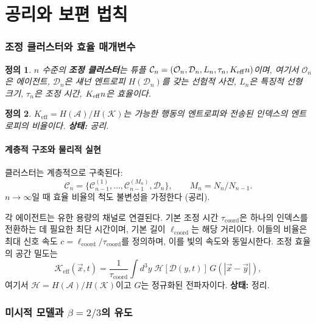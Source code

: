 \documentclass[11pt,a4paper]{article}
\newtheorem{definition}{정의}[section]
\newcommand{\Keff}[1][]{K_{\mathrm{eff}\if\relax\detokenize{#1}\relax\else,#1\fi}}
\newcommand{\coord}{\mathrm{coord}}
\newcommand{\Dir}{\mathcal{D}}
\newcommand{\cC}{\mathcal{C}}
\begin{document}
	\tableofcontents
	\newpage
	
	\part{공리와 보편 법칙}
	
	\section{조정 클러스터와 효율 매개변수}
	\begin{definition}
		\(n\) 수준의 \textbf{조정 클러스터}는 튜플 \(\cC_n = (\mathcal{O}_n, \Dir_n, L_n, \tau_n, \Keff{n})\)이며, 여기서 \(\mathcal{O}_n\)은 에이전트, \(\Dir_n\)은 섀넌 엔트로피 \(H(\Dir_n)\)를 갖는 선험적 사전, \(L_n\)은 특징적 선형 크기, \(\tau_n\)은 조정 시간, \(\Keff{n}\)은 효율이다.
	\end{definition}
	
	\begin{definition}
		\(K_{\mathrm{eff}} = H(\mathcal{A})/H(\mathcal{K})\)는 가능한 행동의 엔트로피와 전송된 인덱스의 엔트로피의 비율이다. \textbf{상태:} 공리.
	\end{definition}
	
	\subsection{계층적 구조와 물리적 실현}
	클러스터는 계층적으로 구축된다:
	\[
	\cC_n = \{\cC_{n-1}^{(1)},\dots,\cC_{n-1}^{(M_n)},\Dir_n\}, \qquad M_n = N_n/N_{n-1}.
	\]
	\(n\to\infty\)일 때 효율 비율의 척도 불변성을 가정한다 (공리).
	
	각 에이전트는 유한 용량의 채널로 연결된다. 기본 조정 시간 \(\tau_{\coord}\)은 하나의 인덱스를 전환하는 데 필요한 최단 시간이며, 기본 길이 \(\ell_{\coord}\)는 해당 거리이다. 이들의 비율은 최대 신호 속도 \(c = \ell_{\coord}/\tau_{\coord}\)를 정의하며, 이를 빛의 속도와 동일시한다. 조정 효율의 공간 밀도는
	\begin{equation}
		\mathcal{K}_{\mathrm{eff}}(\vec{x},t) = \frac{1}{\tau_{\coord}} \int d^3y\; \mathcal{H}[\Dir(y,t)]\, G(|\vec{x}-\vec{y}|),
		\label{eq:Kfield}
	\end{equation}
	여기서 \(\mathcal{H} = H(\mathcal{A})/H(\mathcal{K})\)이고 \(G\)는 정규화된 전파자이다. \textbf{상태:} 정리.
	
	\section{미시적 모델과 \(\beta = 2/3\)의 유도}
	\label{sec:micro}
	
\end{document}
